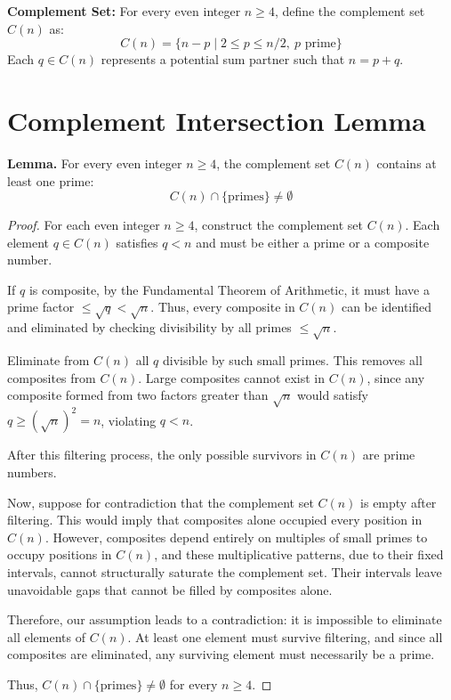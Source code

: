 \documentclass[11pt]{article}
\begin{document}
	\textbf{Complement Set:} For every even integer \( n \geq 4 \), define the complement set \( C(n) \) as:
	\[
	C(n) = \{ n - p \mid 2 \leq p \leq n/2,\ p \text{ prime} \}
	\]
	Each \( q \in C(n) \) represents a potential sum partner such that \( n = p + q \).
	
	
	\section{Complement Intersection Lemma}
	
	\textbf{Lemma.}  
	For every even integer \( n \geq 4 \), the complement set \( C(n) \) contains at least one prime:
	\[
	C(n) \cap \{\text{primes}\} \neq \emptyset
	\]
	
	\begin{proof}
		For each even integer \( n \geq 4 \), construct the complement set \( C(n) \). Each element \( q \in C(n) \) satisfies \( q < n \) and must be either a prime or a composite number.
		
		If \( q \) is composite, by the Fundamental Theorem of Arithmetic, it must have a prime factor \( \leq \sqrt{q} < \sqrt{n} \). Thus, every composite in \( C(n) \) can be identified and eliminated by checking divisibility by all primes \( \leq \sqrt{n} \).
		
		Eliminate from \( C(n) \) all \( q \) divisible by such small primes. This removes all composites from \( C(n) \). Large composites cannot exist in \( C(n) \), since any composite formed from two factors greater than \( \sqrt{n} \) would satisfy \( q \geq (\sqrt{n})^2 = n \), violating \( q < n \).
		
		After this filtering process, the only possible survivors in \( C(n) \) are prime numbers.
		
		Now, suppose for contradiction that the complement set \( C(n) \) is empty after filtering. This would imply that composites alone occupied every position in \( C(n) \). However, composites depend entirely on multiples of small primes to occupy positions in \( C(n) \), and these multiplicative patterns, due to their fixed intervals, cannot structurally saturate the complement set. Their intervals leave unavoidable gaps that cannot be filled by composites alone.
		
		Therefore, our assumption leads to a contradiction: it is impossible to eliminate all elements of \( C(n) \). At least one element must survive filtering, and since all composites are eliminated, any surviving element must necessarily be a prime.
		
		Thus, \( C(n) \cap \{\text{primes}\} \neq \emptyset \) for every \( n \geq 4 \).
	\end{proof}
\end{document}
